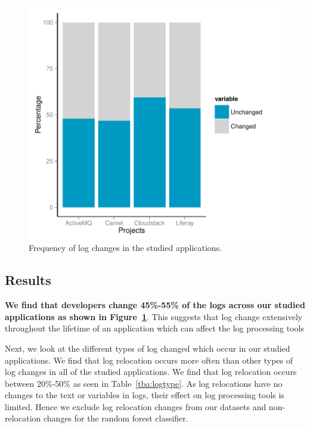 \begin{figure}[tb]
	\centering
	\includegraphics[width=0.9\linewidth]{Percentageofchanges}
	\caption{Frequency of log changes in the studied applications.}
	\label{fig:RQ1_Liferay_Camel_Logchangefreq}
\end{figure}





\subsection{Results}

\textbf{We find that developers change 45\%-55\% of the logs across our studied applications as shown in Figure~\ref{fig:RQ1_Liferay_Camel_Logchangefreq}}. This suggests that log change extensively throughout the lifetime of an application which can affect the log processing tools

Next, we look at the different types of log changed which occur in our studied applications. We find that log relocation occurs more often than other types of log changes in all of the studied applications. We find that log relocation occurs between 20\%-50\% as seen in Table~\ref{tba:logtype}. As log relocations have no changes to the text or variables in logs, their effect on log processing tools is limited. Hence we exclude log relocation changes from our datasets and non-relocation changes for the random forest classifier. 

